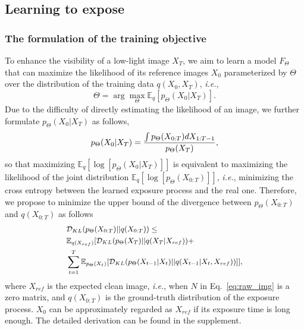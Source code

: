 \documentclass[10pt,twocolumn,letterpaper]{article}
\def\ie{\textit{i.e.}}
\newcommand{\D}[2]{\mathcal{D}_{KL}(#1||#2)}
\newcommand{\E}[2]{\mathbb{E}_{#1}[#2]}
\def\p{p_\Theta}
\begin{document}
\subsection{Learning to expose}
\vspace{-0.05cm}
\subsubsection{The formulation of the training objective}
\vspace{-0.05cm}
To enhance the visibility of a low-light image $X_T$, we aim to learn a model $F_\Theta$ that can maximize the likelihood of its reference images $X_{0}$ parameterized by $\Theta$ over the distribution of the training data $q(X_0, X_T)$, \ie,
\begin{equation}
    \Theta = \arg \max_\Theta \E{q}{p_{\Theta}(X_{0}|X_T)}.
\end{equation}
Due to the difficulty of directly estimating the likelihood of an image, we further formulate $p_{\Theta}(X_{0}|X_T)$ as follows,
\begin{equation}
\small
    p_{\Theta}(X_{0}|X_T) = \frac{\int p_{\Theta} (X_{0:T}) d X_{1:T-1}}{p_{\Theta}(X_T)},
\end{equation}
so that maximizing $\E{q}{\log[p_{\Theta}(X_{0}|X_T)]}$ is equivalent to maximizing the likelihood of the joint distribution $\E{q}{\log[\p(X_{0:T})]}$, \ie, minimizing the cross entropy between the learned exposure process and the real one. Therefore, we propose to minimize the upper bound of the divergence between $p_\Theta(X_{0:T})$ and $q(X_{0:T})$ as follows
\begin{equation}
\small
\begin{aligned}
&\D{\p(X_{0:T})}{q(X_{0:T})} \leq 
    \\
    &\E{q(X_{ref})}{\D{\p(X_T)}{q(X_T|X_{ref})} + \\
    &\sum_{t=1}^{T} \E{\p(X_t)}{\D{\p(X_{t-1}|X_{t})}{q(X_{t-1}|X_t,X_{ref})}}},
\end{aligned}
\label{eq:bound}
\end{equation}
where $X_{ref}$ is the expected clean image, \ie, when $N$ in Eq.~\ref{eq:raw_img} is a zero matrix, and $q(X_{0:T})$ is the ground-truth distribution of the exposure process. $X_0$ can be approximately regarded as $X_{ref}$ if its exposure time is long enough. The detailed derivation can be found in the supplement. 
\end{document}
